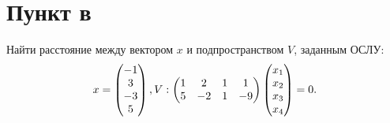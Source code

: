 \documentclass[12pt]{article}
\begin{document}
    \section*{Пункт в}
    Найти расстояние между вектором $x$ и подпространством $V$, заданным ОСЛУ:
    \[
        x =
        \begin{pmatrix}
            -1 \\ 3 \\ -3 \\ 5
        \end{pmatrix}, \\
        V:
        \begin{pmatrix}
            1 & 2  & 1 & 1  \\
            5 & -2 & 1 & -9
        \end{pmatrix}
        \begin{pmatrix}
            x_1 \\ x_2 \\ x_3 \\ x_4
        \end{pmatrix}
        = 0 .
    \]
\end{document}
